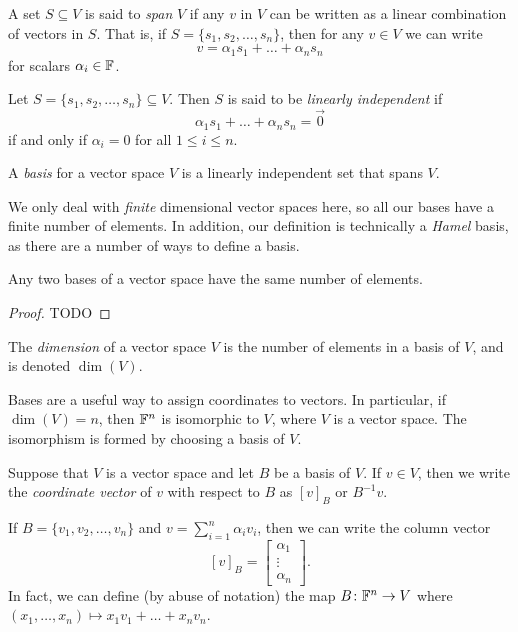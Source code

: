  \begin{definition}
   A set $S \subseteq V$ is said to \emph{span} $V$ if any $v$ in $V$ can be written as a linear combination of vectors in $S$. That is, if $S = \{s_1, s_2, \dots, s_n\}$, then for any $v \in V$ we can write \[
     v = \alpha_1 s_1 + \dots + \alpha_n s_n
   \] for scalars $\alpha_i \in \mathbb{F}$.
\end{definition}

\begin{definition}
  Let $S = \{s_1, s_2, \dots, s_n\} \subseteq V$. Then $S$ is said to be \emph{linearly independent} if \[
    \alpha_1 s_1 + \dots + \alpha_n s_n = \vec{0}
  \] if and only if $\alpha_i = 0$ for all $1 \le i \le n$.
\end{definition}

\begin{definition}
  A \emph{basis} for a vector space $V$ is a linearly independent set that spans $V$.
\end{definition}

\begin{remark}
  We only deal with \textit{finite} dimensional vector spaces here, so all our bases have a finite number of elements. In addition, our definition is technically a \emph{Hamel} basis, as there are a number of ways to define a basis.
\end{remark}

\begin{proposition}
  Any two bases of a vector space have the same number of elements.
\end{proposition}
\begin{proof}
  TODO
\end{proof}

\begin{definition}
  The \emph{dimension} of a vector space $V$ is the number of elements in a basis of $V$, and is denoted $\dim(V)$.
\end{definition}

Bases are a useful way to assign coordinates to vectors. In particular, if $\dim(V)=n$, then $\mathbb{F}^{n}$ is isomorphic to $V$, where $V$ is a vector space. The isomorphism is formed by choosing a basis of $V$.

Suppose that $V$ is a vector space and let $B$ be a basis of $V$. If $v \in V$, then we write the \emph{coordinate vector} of $v$ with respect to $B$ as $[v]_B$ or $B^{-1}v$.

If $B = \{v_1, v_2, \dots, v_n\}$ and $v = \sum_{i = 1}^{n} \alpha_i v_i$, then we can write the column vector \[
  [v]_B = \begin{bmatrix} \alpha_1 \\ \vdots \\ \alpha_n \end{bmatrix}.
\] 
In fact, we can define (by abuse of notation) the map $B\colon \mathbb{F}^{n} \to V$ where $(x_1, \dots, x_n) \mapsto x_1v_1 + \dots + x_nv_n$.

